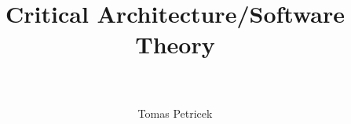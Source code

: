 \documentclass[fleqn,11pt]{report}
\begin{document}
\title{\Huge \textbf{Critical Architecture/Software Theory}\\~\\}
\author{Tomas Petricek}
\maketitle

%
%
%






\end{document}
